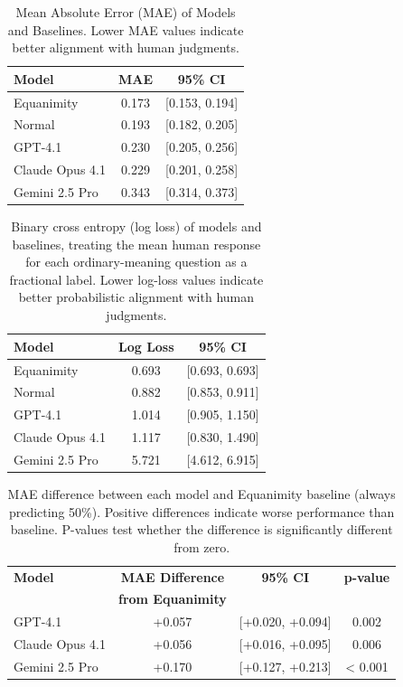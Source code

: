\begin{table}[H]
\centering
\begin{tabular}{lcc}
\hline
\textbf{Model} & \textbf{MAE} & \textbf{95\% CI} \\
\hline
Equanimity & 0.173 & [0.153, 0.194] \\
Normal & 0.193 & [0.182, 0.205] \\
\hline
GPT-4.1 & 0.230 & [0.205, 0.256] \\
Claude Opus 4.1 & 0.229 & [0.201, 0.258] \\
Gemini 2.5 Pro & 0.343 & [0.314, 0.373] \\
\hline
\end{tabular}
\caption{Mean Absolute Error (MAE) of Models and Baselines. Lower MAE values indicate better alignment with human judgments.}
\label{tab:mae_results}
\end{table}
\FloatBarrier

\begin{table}[H]
\centering
\begin{tabular}{lcc}
\hline
\textbf{Model} & \textbf{Log Loss} & \textbf{95\% CI} \\
\hline
Equanimity & 0.693 & [0.693, 0.693] \\
Normal & 0.882 & [0.853, 0.911] \\
\hline
GPT-4.1 & 1.014 & [0.905, 1.150] \\
Claude Opus 4.1 & 1.117 & [0.830, 1.490] \\
Gemini 2.5 Pro & 5.721 & [4.612, 6.915] \\
\hline
\end{tabular}
\caption{Binary cross entropy (log loss) of models and baselines, treating the mean human response for each ordinary-meaning question as a fractional label. Lower log-loss values indicate better probabilistic alignment with human judgments.}
\label{tab:log_loss_results}
\end{table}
\FloatBarrier

\begin{table}[H]
\centering
\begin{tabular}{lccc}
\hline
\textbf{Model} & \textbf{MAE Difference} & \textbf{95\% CI} & \textbf{p-value} \\
 & \textbf{from Equanimity} & & \\
\hline
GPT-4.1 & +0.057 & [+0.020, +0.094] & 0.002 \\
Claude Opus 4.1 & +0.056 & [+0.016, +0.095] & 0.006 \\
Gemini 2.5 Pro & +0.170 & [+0.127, +0.213] & < 0.001 \\
\hline
\end{tabular}
\caption{MAE difference between each model and Equanimity baseline (always predicting 50\%). Positive differences indicate worse performance than baseline. P-values test whether the difference is significantly different from zero.}
\label{tab:mae_vs_equanimity}
\end{table}
\FloatBarrier

